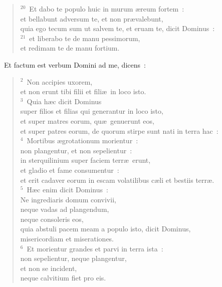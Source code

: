 \begin{flushleft}
\begin{verse}
${}^{20}$~Et dabo te populo huic in murum \ae reum fortem~:\\ et bellabunt adversum te, et non pr\ae valebunt,\\ quia ego tecum sum ut salvem te, et eruam te, dicit Dominus~:\\
${}^{21}$~et liberabo te de manu pessimorum,\\ et redimam te de manu fortium.\end{verse}\end{flushleft}


~\lettrine[lines=10,image=true,loversize=0.05,lraise=-0.03]{E}{}t factum est verbum Domini ad me, dicens~:
\begin{flushleft}\begin{verse}\vspace{6pt}${}^{2}$~Non accipies uxorem,\\ et non erunt tibi filii et fili\ae\ in loco isto.\\
${}^{3}$~Quia h\ae c dicit Dominus\\ super filios et filias qui generantur in loco isto,\\ et super matres eorum, qu\ae\ genuerunt eos,\\ et super patres eorum, de quorum stirpe sunt nati in terra hac~:\\
${}^{4}$~Mortibus \ae grotationum morientur~:\\ non plangentur, et non sepelientur~:\\ in sterquilinium super faciem terr\ae\ erunt,\\ et gladio et fame consumentur~:\\ et erit cadaver eorum in escam volatilibus c\ae li et bestiis terr\ae .\\
${}^{5}$~H\ae c enim dicit Dominus~:\\ Ne ingrediaris domum convivii,\\ neque vadas ad plangendum,\\ neque consoleris eos,\\ quia abstuli pacem meam a populo isto, dicit Dominus,\\ misericordiam et miserationes.\\
${}^{6}$~Et morientur grandes et parvi in terra ista~:\\ non sepelientur, neque plangentur,\\ et non se incident,\\ neque calvitium fiet pro eis.\\

\end{verse}
\end{flushleft}
